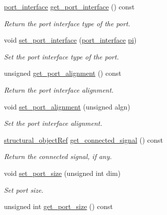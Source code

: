 \begin{DoxyCompactItemize}
\hyperlink{structport__o_a37d2e6a450aea997028478f5bfb4e1f6}{port\+\_\+interface} \hyperlink{structport__o_a2e4c47c49aea2fdc63548452a1391599}{get\+\_\+port\+\_\+interface} () const
\begin{DoxyCompactList}\small\item\em Return the port interface type of the port. \end{DoxyCompactList}\item 
void \hyperlink{structport__o_abb03bbce9d78f79d17dbc64d9f8fc2f2}{set\+\_\+port\+\_\+interface} (\hyperlink{structport__o_a37d2e6a450aea997028478f5bfb4e1f6}{port\+\_\+interface} \hyperlink{structport__o_ae8736b3b15c2828aa9908d25781d028e}{pi})
\begin{DoxyCompactList}\small\item\em Set the port interface type of the port. \end{DoxyCompactList}\item 
unsigned \hyperlink{structport__o_a5b1def66023d9a1a0e63102c15e9b433}{get\+\_\+port\+\_\+alignment} () const
\begin{DoxyCompactList}\small\item\em Return the port interface alignment. \end{DoxyCompactList}\item 
void \hyperlink{structport__o_a575f1ac38a4c1884b8e589080e135168}{set\+\_\+port\+\_\+alignment} (unsigned algn)
\begin{DoxyCompactList}\small\item\em Set the port interface alignment. \end{DoxyCompactList}\item 
\hyperlink{structural__objects_8hpp_a8ea5f8cc50ab8f4c31e2751074ff60b2}{structural\+\_\+object\+Ref} \hyperlink{structport__o_aa6bb158d117116992b5d19e9af2b59b8}{get\+\_\+connected\+\_\+signal} () const
\begin{DoxyCompactList}\small\item\em Return the connected signal, if any. \end{DoxyCompactList}\item 
void \hyperlink{structport__o_a4f8462c05383622e041c2af643ddedf7}{set\+\_\+port\+\_\+size} (unsigned int dim)
\begin{DoxyCompactList}\small\item\em Set port size. \end{DoxyCompactList}\item 
unsigned int \hyperlink{structport__o_a7c8f3f6dab60cc5d4a81adce48a73d0c}{get\+\_\+port\+\_\+size} () const

\end{DoxyCompactItemize}
